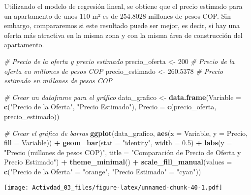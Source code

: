 \documentclass[
]{article}
\newenvironment{Shaded}{\begin{snugshade}}{\end{snugshade}}
\newcommand{\AttributeTok}[1]{\textcolor[rgb]{0.13,0.29,0.53}{#1}}
\newcommand{\CommentTok}[1]{\textcolor[rgb]{0.56,0.35,0.01}{\textit{#1}}}
\newcommand{\DecValTok}[1]{\textcolor[rgb]{0.00,0.00,0.81}{#1}}
\newcommand{\FloatTok}[1]{\textcolor[rgb]{0.00,0.00,0.81}{#1}}
\newcommand{\FunctionTok}[1]{\textcolor[rgb]{0.13,0.29,0.53}{\textbf{#1}}}
\newcommand{\NormalTok}[1]{#1}
\newcommand{\OtherTok}[1]{\textcolor[rgb]{0.56,0.35,0.01}{#1}}
\newcommand{\SpecialCharTok}[1]{\textcolor[rgb]{0.81,0.36,0.00}{\textbf{#1}}}
\newcommand{\StringTok}[1]{\textcolor[rgb]{0.31,0.60,0.02}{#1}}
\begin{document}
Utilizando el modelo de regresión lineal, se obtiene que el precio
estimado para un apartamento de unos 110 m² es de 254.8028 millones de
pesos COP. Sin embargo, compararemos si este resultado puede ser mejor,
es decir, si hay una oferta más atractiva en la misma zona y con la
misma área de construcción del apartamento.

\begin{Shaded}
\begin{Highlighting}[]
\CommentTok{\# Precio de la oferta y precio estimado}
\NormalTok{precio\_oferta }\OtherTok{\textless{}{-}} \DecValTok{200}  \CommentTok{\# Precio de la oferta en millones de pesos COP}
\NormalTok{precio\_estimado }\OtherTok{\textless{}{-}} \FloatTok{260.5378}  \CommentTok{\# Precio estimado en millones de pesos COP}

\CommentTok{\# Crear un dataframe para el gráfico}
\NormalTok{data\_grafico }\OtherTok{\textless{}{-}} \FunctionTok{data.frame}\NormalTok{(}\AttributeTok{Variable =} \FunctionTok{c}\NormalTok{(}\StringTok{"Precio de la Oferta"}\NormalTok{, }\StringTok{"Precio Estimado"}\NormalTok{),}
                           \AttributeTok{Precio =} \FunctionTok{c}\NormalTok{(precio\_oferta, precio\_estimado))}

\CommentTok{\# Crear el gráfico de barras}
\FunctionTok{ggplot}\NormalTok{(data\_grafico, }\FunctionTok{aes}\NormalTok{(}\AttributeTok{x =}\NormalTok{ Variable, }\AttributeTok{y =}\NormalTok{ Precio, }\AttributeTok{fill =}\NormalTok{ Variable)) }\SpecialCharTok{+}
  \FunctionTok{geom\_bar}\NormalTok{(}\AttributeTok{stat =} \StringTok{"identity"}\NormalTok{, }\AttributeTok{width =} \FloatTok{0.5}\NormalTok{) }\SpecialCharTok{+}
  \FunctionTok{labs}\NormalTok{(}\AttributeTok{y =} \StringTok{"Precio (millones de pesos COP)"}\NormalTok{, }\AttributeTok{title =} \StringTok{"Comparación de Precio de Oferta y Precio Estimado"}\NormalTok{) }\SpecialCharTok{+}
  \FunctionTok{theme\_minimal}\NormalTok{() }\SpecialCharTok{+}
  \FunctionTok{scale\_fill\_manual}\NormalTok{(}\AttributeTok{values =} \FunctionTok{c}\NormalTok{(}\StringTok{"Precio de la Oferta"} \OtherTok{=} \StringTok{"orange"}\NormalTok{, }\StringTok{"Precio Estimado"} \OtherTok{=} \StringTok{"cyan"}\NormalTok{))}
\end{Highlighting}
\end{Shaded}

\texttt{[image: Activdad\_03\_files/figure-latex/unnamed-chunk-40-1.pdf]}
\end{document}
